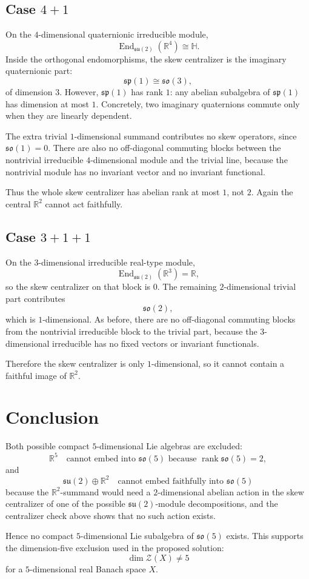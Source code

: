 \documentclass[11pt]{article}
\newcommand{\R}{\mathbb R}
\newcommand{\so}{\mathfrak{so}}
\newcommand{\su}{\mathfrak{su}}
\newcommand{\spalg}{\mathfrak{sp}}
\DeclareMathOperator{\End}{End}
\begin{document}
\subsection*{Case \(4+1\)}

On the \(4\)-dimensional quaternionic irreducible module,
\[
  \End_{\su(2)}(\R^4)\cong\mathbb H.
\]
Inside the orthogonal endomorphisms, the skew centralizer is the imaginary
quaternionic part:
\[
  \spalg(1)\cong\so(3),
\]
of dimension \(3\).  However, \(\spalg(1)\) has rank \(1\): any abelian
subalgebra of \(\spalg(1)\) has dimension at most \(1\).  Concretely, two
imaginary quaternions commute only when they are linearly dependent.

The extra trivial \(1\)-dimensional summand contributes no skew operators,
since \(\so(1)=0\).  There are also no off-diagonal commuting blocks between
the nontrivial irreducible \(4\)-dimensional module and the trivial line,
because the nontrivial module has no invariant vector and no invariant
functional.

Thus the whole skew centralizer has abelian rank at most \(1\), not \(2\).
Again the central \(\R^2\) cannot act faithfully.

\subsection*{Case \(3+1+1\)}

On the \(3\)-dimensional irreducible real-type module,
\[
  \End_{\su(2)}(\R^3)=\R,
\]
so the skew centralizer on that block is \(0\).  The remaining
\(2\)-dimensional trivial part contributes
\[
  \so(2),
\]
which is \(1\)-dimensional.  As before, there are no off-diagonal commuting
blocks from the nontrivial irreducible block to the trivial part, because the
\(3\)-dimensional irreducible has no fixed vectors or invariant functionals.

Therefore the skew centralizer is only \(1\)-dimensional, so it cannot contain
a faithful image of \(\R^2\).

\section*{Conclusion}

Both possible compact \(5\)-dimensional Lie algebras are excluded:
\[
  \R^5
  \quad\text{cannot embed into }\so(5)\text{ because }\operatorname{rank}\so(5)=2,
\]
and
\[
  \su(2)\oplus\R^2
  \quad\text{cannot embed faithfully into }\so(5)
\]
because the \(\R^2\)-summand would need a \(2\)-dimensional abelian action in
the skew centralizer of one of the possible \(\su(2)\)-module decompositions,
and the centralizer check above shows that no such action exists.

Hence no compact \(5\)-dimensional Lie subalgebra of \(\so(5)\) exists.  This
supports the dimension-five exclusion used in the proposed solution:
\[
  \dim\mathcal Z(X)\neq 5
\]
for a \(5\)-dimensional real Banach space \(X\).
\end{document}

